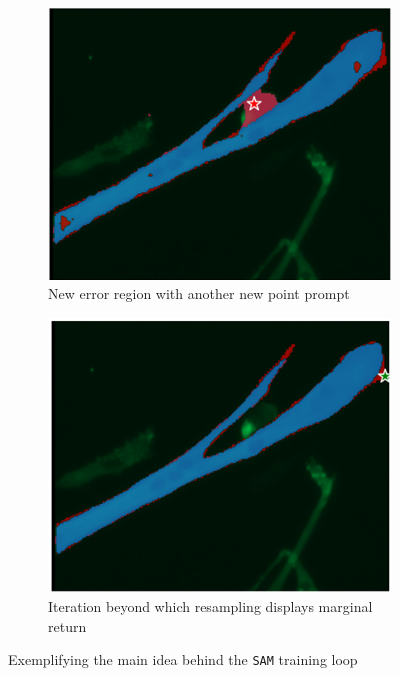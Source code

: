 \begin{figure}
	\medskip
	
	\begin{subfigure}{0.45\textwidth}
		\centering
		\includegraphics[width=\linewidth]{images/training3}
		\caption{New error region with another new point prompt}
		\label{figtrain3}
	\end{subfigure}
	\hfill
	\begin{subfigure}{0.45\textwidth}
		\centering
		\includegraphics[width=\linewidth]{images/training4}
		\caption{Iteration beyond which resampling displays marginal return}
		\label{figtrain4}
	\end{subfigure}
	\caption[\texttt{SAM} trainings loop]{Exemplifying the main idea behind the \texttt{SAM} training loop}
	\label{figtrain}
\end{figure}

